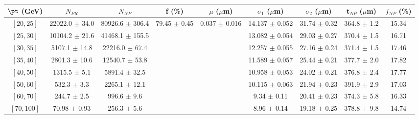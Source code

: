 \begin{tabular}{c||c|c|c|c|c|c|c||c}
$\pt$ (GeV) & $N_{PR}$ & $N_{NP}$ & f (\%) & $\mu$ ($\mu$m) & $\sigma_1$ ($\mu$m) & $\sigma_2$ ($\mu$m)  & t$_{NP}$ ($\mu$m) & $f_{NP}$ (\%) \\
\hline
$[20, 25]$ & 22022.0 $\pm$ 34.0 & 80926.6 $\pm$ 306.4 & \multirow{8}{*}{79.45 $\pm$ 0.45} & \multirow{8}{*}{0.037 $\pm$ 0.016} & 14.137 $\pm$ 0.052 & 31.74 $\pm$ 0.32 & 364.8 $\pm$ 1.2 & 15.34\\
$[25, 30]$ & 10104.2 $\pm$ 21.6 & 41468.1 $\pm$ 155.5 &  &  & 13.082 $\pm$ 0.054 & 29.03 $\pm$ 0.27 & 370.4 $\pm$ 1.5 & 16.71\\
$[30, 35]$ & 5107.1 $\pm$ 14.8 & 22216.0 $\pm$ 67.4 &  &  & 12.257 $\pm$ 0.055 & 27.16 $\pm$ 0.24 & 371.4 $\pm$ 1.5 & 17.46\\
$[35, 40]$ & 2801.3 $\pm$ 10.6 & 12540.7 $\pm$ 53.8 &  &  & 11.589 $\pm$ 0.057 & 25.44 $\pm$ 0.21 & 377.7 $\pm$ 2.0 & 17.82\\
$[40, 50]$ & 1315.5 $\pm$ 5.1 & 5891.4 $\pm$ 32.5 &  &  & 10.958 $\pm$ 0.053 & 24.02 $\pm$ 0.21 & 376.8 $\pm$ 2.4 & 17.77\\
$[50, 60]$ & 532.3 $\pm$ 3.3 & 2265.1 $\pm$ 12.1 &  &  & 10.115 $\pm$ 0.063 & 21.94 $\pm$ 0.23 & 391.9 $\pm$ 2.9 & 17.03\\
$[60, 70]$ & 244.7 $\pm$ 2.5 & 996.6 $\pm$ 9.6 &  &  & 9.34 $\pm$ 0.11 & 20.41 $\pm$ 0.23 & 374.3 $\pm$ 5.8 & 16.33\\
$[70, 100]$ & 70.98 $\pm$ 0.93 & 256.3 $\pm$ 5.6 &  &  & 8.96 $\pm$ 0.14 & 19.18 $\pm$ 0.25 & 378.8 $\pm$ 9.8 & 14.74\\
\end{tabular}
